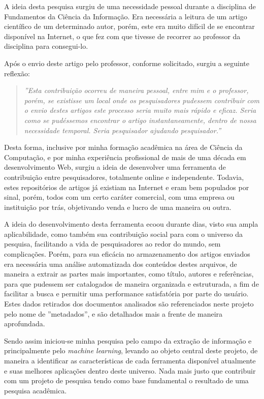 
\begin{textnew}

A ideia desta pesquisa surgiu de uma necessidade pessoal durante a disciplina de Fundamentos da Ciência da Informação. Era necessária a leitura de um artigo científico de um determinado autor, porém, este era muito difícil de se encontrar disponível na Internet, o que fez com que tivesse de recorrer ao professor da disciplina para consegui-lo.

Após o envio deste artigo pelo professor, conforme solicitado, surgiu a seguinte reflexão:

\begin{quote}
	\textit{''Esta contribuição ocorreu de maneira pessoal, entre mim e o professor, porém, se existisse um local onde os pesquisadores pudessem contribuir com o envio destes artigos este processo seria muito mais rápido e eficaz. Seria como se pudéssemos encontrar o artigo instantaneamente, dentro de nossa necessidade temporal. Seria pesquisador ajudando pesquisador.''}
\end{quote}

Desta forma, inclusive por minha formação acadêmica na área de Ciência da Computação, e por minha experiência profissional de mais de uma década em desenvolvimento Web, surgiu a ideia de desenvolver uma ferramenta de contribuição entre pesquisadores, totalmente online e independente. Todavia, estes repositórios de artigos já existiam na Internet e eram bem populados por sinal, porém, todos com um certo caráter comercial, com uma empresa ou instituição por trás, objetivando venda e lucro de uma maneira ou outra.

A ideia do desenvolvimento desta ferramenta ecoou durante dias, visto sua ampla aplicabilidade, como também sua contribuição social para com o universo da pesquisa, facilitando a vida de pesquisadores ao redor do mundo, sem complicações. Porém, para sua eficácia no armazenamento dos artigos enviados era necessária uma análise automatizada dos conteúdos destes arquivos, de maneira a extrair as partes mais importantes, como título, autores e referências, para que pudessem ser catalogados de maneira organizada e estruturada, a fim de facilitar a busca e permitir uma performance satisfatória por parte do usuário. Estes dados retirados dos documentos analisados são referenciados neste projeto pelo nome de ''metadados'', e são detalhados mais a frente de maneira aprofundada.

Sendo assim iniciou-se minha pesquisa pelo campo da extração de informação e principalmente pelo \textit{machine learning}, levando ao objeto central deste projeto, de maneira a identificar as características de cada ferramenta disponível atualmente e suas melhores aplicações dentro deste universo. Nada mais justo que contribuir com um projeto de pesquisa tendo como base fundamental o resultado de uma pesquisa acadêmica.

\end{textnew}

